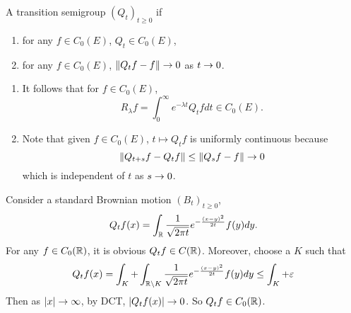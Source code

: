 \begin{defn}
    A transition semigroup $(Q_t)_{t \geq 0}$ if
    \begin{enumerate}[label=(\roman{*})]
        \item for any $f \in C_0(E)$, $Q_t \in C_0(E)$,
        \item for any $f \in C_0(E)$, $\left\lVert Q_t f - f\right\lVert \rightarrow 0$ as $t \rightarrow 0$.
    \end{enumerate}
\end{defn}
\begin{rmk}
    \begin{enumerate}[label=(\roman*)]
        \item It follows that for $f \in C_0(E)$, 
        \begin{equation*}
            R_\lambda f = \int_0^\infty e^{-\lambda t}Q_t f dt \in C_0(E).
        \end{equation*}
        \item Note that given $f \in C_0(E)$, $t \mapsto Q_tf$ is uniformly continuous because
        \begin{equation*}
            \left\lVert Q_{t+s}f - Q_t f\right\lVert \leq \left\lVert Q_sf - f\right\lVert \rightarrow 0
        \end{equation*}
        which is independent of $t$ as $s \rightarrow 0$. 
    \end{enumerate}
\end{rmk}

\begin{exam}
    Consider a standard Brownian motion $(B_t)_{t \geq 0}$,
    \begin{equation*}
        Q_tf(x) = \int_{\mathbb{R}} \frac{1}{\sqrt{2\pi t}}e^{-\frac{(x-y)^2}{2t}}f(y)dy.
    \end{equation*}
    For any $f \in C_0(\mathbb{R})$, it is obvious $Q_tf \in C(\mathbb{R})$. Moreover, choose a $K$ such that
    \begin{equation*}
        Q_tf(x) = \int_K + \int_{\mathbb{R} \backslash K}\frac{1}{\sqrt{2\pi t}}e^{-\frac{(x-y)^2}{2t}}f(y)dy \leq \int_K + \varepsilon
    \end{equation*}
    Then as $\left\lvert x\right\lvert \rightarrow \infty$, by DCT, $\left\lvert Q_tf(x)\right\lvert \rightarrow 0$. So $Q_tf \in C_0(\mathbb{R})$. 
\end{exam}

